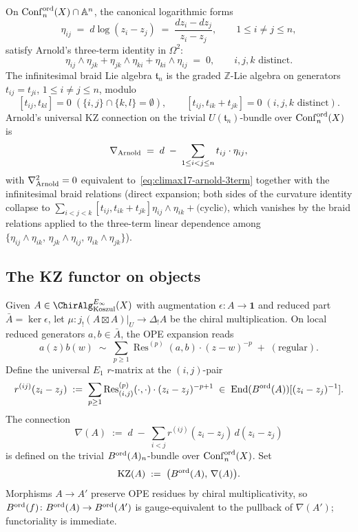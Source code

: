On $\operatorname{Conf}_n^{\mathrm{ord}}(X)\cap\mathbb{A}^n$, the canonical logarithmic
forms
\[
  \eta_{ij}\;=\;d\log(z_i-z_j)\;=\;\frac{dz_i-dz_j}{z_i-z_j},
  \qquad 1\leq i\neq j\leq n,
\]
satisfy Arnold's three-term identity in $\Omega^2$:
\begin{equation}
\label{eq:climax17-arnold-3term}
  \eta_{ij}\wedge\eta_{jk}
  +\eta_{jk}\wedge\eta_{ki}
  +\eta_{ki}\wedge\eta_{ij}
  \;=\;0,\qquad i,j,k\text{ distinct}.
\end{equation}
The infinitesimal braid Lie algebra $\mathfrak{t}_n$ is the graded
$\mathbb{Z}$-Lie algebra on generators $t_{ij}=t_{ji}$,
$1\leq i\neq j\leq n$, modulo
\[
  [t_{ij},t_{kl}]=0\;(\{i,j\}\cap\{k,l\}=\emptyset),\qquad
  [t_{ij},t_{ik}+t_{jk}]=0\;(i,j,k\text{ distinct}).
\]
Arnold's universal KZ connection on the trivial $U(\mathfrak{t}_n)$-bundle
over $\operatorname{Conf}_n^{\mathrm{ord}}(X)$ is
\begin{equation}
\label{eq:climax17-arnold-connection}
  \nabla_{\mathrm{Arnold}}\;=\;d\;-\;\sum_{1\leq i<j\leq n}t_{ij}\cdot\eta_{ij},
\end{equation}
with $\nabla_{\mathrm{Arnold}}^2=0$ equivalent to~\eqref{eq:climax17-arnold-3term} together
with the infinitesimal braid relations (direct expansion; both sides of
the curvature identity collapse to $\sum_{i<j<k}[t_{ij},t_{ik}+t_{jk}]
\eta_{ij}\wedge\eta_{ik}+\text{(cyclic)}$, which vanishes by the
braid relations applied to the three-term linear dependence among
$\{\eta_{ij}\wedge\eta_{ik},\,\eta_{jk}\wedge\eta_{ij},
\,\eta_{ik}\wedge\eta_{jk}\}$).

\subsection{The KZ functor on objects}
\label{subsec:climax17-kz-functor}

Given $A\in\ChirAlg^{E_\infty}_{\mathrm{Koszul}}(X)$ with augmentation
$\epsilon\colon A\to\mathbf{1}$ and reduced part $\bar A=\ker\epsilon$,
let $\mu\colon j_{!}(A\boxtimes A)|_U\to\Delta_{!}A$ be the chiral
multiplication. On local reduced generators $a,b\in\bar A$, the OPE
expansion reads
\[
  a(z)b(w)\;\sim\;\sum_{p\geq 1}\operatorname{Res}^{(p)}(a,b)\cdot(z-w)^{-p}
  \;+\;(\text{regular}).
\]
Define the universal $E_1$ $r$-matrix at the $(i,j)$-pair
\begin{equation}
\label{eq:climax17-universal-rmatrix}
  r^{(ij)}(z_i-z_j)
  \;:=\;\sum_{p\geq 1}\operatorname{Res}^{(p)}_{(i,j)}(\cdot,\cdot)
  \cdot(z_i-z_j)^{-p+1}
  \;\in\;\mathrm{End}(B^{\mathrm{ord}}(A))[(z_i-z_j)^{-1}].
\end{equation}
The connection
\begin{equation}
\label{eq:climax17-nabla-A}
  \nabla(A)\;:=\;d\;-\;\sum_{i<j}r^{(ij)}(z_i-z_j)\,d(z_i-z_j)
\end{equation}
is defined on the trivial $B^{\mathrm{ord}}(A)_n$-bundle over
$\operatorname{Conf}_n^{\mathrm{ord}}(X)$. Set
\[
  \mathrm{KZ}(A)\;:=\;\bigl(B^{\mathrm{ord}}(A),\,\nabla(A)\bigr).
\]
Morphisms $A\to A'$ preserve OPE residues by chiral multiplicativity, so
$B^{\mathrm{ord}}(f)\colon B^{\mathrm{ord}}(A)\to B^{\mathrm{ord}}(A')$ is gauge-equivalent to the pullback
of $\nabla(A')$; functoriality is immediate.

